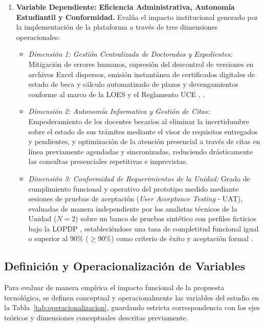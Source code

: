 \begin{enumerate}[label=\textbf{Eje \arabic*:},leftmargin=*]
    \item \textbf{Variable Dependiente: Eficiencia Administrativa, Autonomía Estudiantil y Conformidad.} Evalúa el impacto institucional generado por la implementación de la plataforma a través de tres dimensiones operacionales:
    \begin{itemize}[leftmargin=*,noitemsep]
        \item \textit{Dimensión 1: Gestión Centralizada de Doctorados y Expedientes:} Mitigación de errores humanos, supresión del descontrol de versiones en archivos Excel dispersos, emisión instantánea de certificados digitales de estado de beca y cálculo automatizado de plazos y devengamientos conforme al marco de la LOES y el Reglamento UCE \cite{loes}, \cite{reglamento_uce}.
        \item \textit{Dimensión 2: Autonomía Informativa y Gestión de Citas:} Empoderamiento de los docentes becarios al eliminar la incertidumbre sobre el estado de sus trámites mediante el visor de requisitos entregados y pendientes, y optimización de la atención presencial a través de citas en línea previamente agendadas y sincronizadas, reduciendo drásticamente las consultas presenciales repetitivas e imprevistas.
        \item \textit{Dimensión 3: Conformidad de Requerimientos de la Unidad:} Grado de cumplimiento funcional y operativo del prototipo medido mediante sesiones de pruebas de aceptación (\textit{User Acceptance Testing} - UAT), evaluadas de manera independiente por los analistas técnicos de la Unidad ($N = 2$) sobre un banco de pruebas sintético con perfiles ficticios bajo la LOPDP \cite{lopdp_ecuador}, estableciéndose una tasa de completitud funcional igual o superior al 90\% ($\ge 90\%$) como criterio de éxito y aceptación formal \cite{ieee_requirements}.
    \end{itemize}
\end{enumerate}

\subsection{Definición y Operacionalización de Variables}

Para evaluar de manera empírica el impacto funcional de la propuesta tecnológica, se definen conceptual y operacionalmente las variables del estudio en la Tabla~\ref{tab:operacionalizacion}, guardando estricta correspondencia con los ejes teóricos y dimensiones conceptuales descritas previamente.

